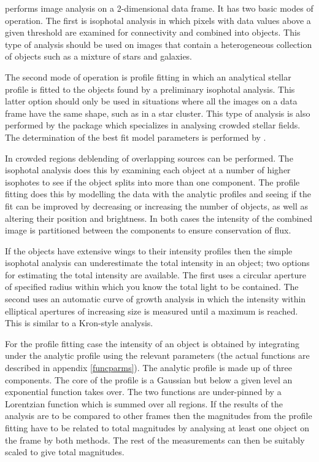  performs image analysis on a 2-dimensional data frame. It has
two basic modes of operation. The first is isophotal analysis in
which pixels with data values above a given threshold are examined for
connectivity and combined into objects. This type of analysis should be
used on images that contain a heterogeneous collection of objects such
as a mixture of stars and galaxies.

The second mode of operation is profile fitting in which an analytical
stellar profile is fitted to the objects found by a preliminary
isophotal analysis. This latter option should only be used in
situations where all the images on a data frame have the same shape,
such as in a star cluster. This type of analysis is also performed by
the  package which specializes in analysing
crowded stellar fields.  The determination of the best fit model
parameters is performed by .

In crowded regions deblending of overlapping sources can be performed.
The isophotal analysis does this by examining each object at a number of
higher isophotes to see if the object splits into more than one
component. The profile fitting does this by modelling the data with the
analytic profiles and seeing if the fit can be improved by decreasing or
increasing the number of objects, as well as altering their position and
brightness. In both cases the intensity of the combined image is
partitioned between the components to ensure conservation of flux.

If the objects have extensive wings to their intensity profiles then the
simple isophotal analysis can underestimate the total intensity in an
object; two options for estimating the total intensity are available.
The first uses a circular aperture of specified radius within which you
know the total light to be contained. The second uses an automatic
curve of growth analysis in which the intensity within elliptical
apertures of increasing size is measured until a maximum is reached.
This is similar to a Kron-style analysis.

For the profile fitting case the intensity of an object is obtained by
integrating under the analytic profile using the relevant parameters
(the actual functions are described in appendix \ref{funcparms}). The
analytic profile is made up of three components. The core of the profile
is a Gaussian but below a given level an exponential function
takes over. The two functions are under-pinned by a Lorentzian function
which is summed over all regions. If the results of the analysis are to
be compared to other frames then the magnitudes from the profile fitting
have to be related to total magnitudes by analysing at least one object
on the frame by both methods. The rest of the measurements can then be
suitably scaled to give total magnitudes.

